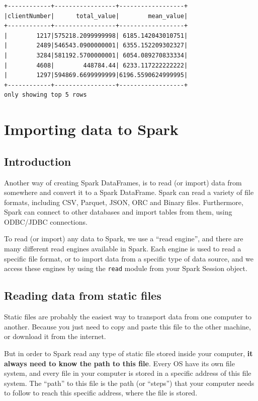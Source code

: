 \documentclass[
  11pt,
  letterpaper,
  DIV=11,
  numbers=noendperiod]{scrreprt}
\begin{document}
\begin{verbatim}
+------------+-----------------+------------------+
|clientNumber|      total_value|        mean_value|
+------------+-----------------+------------------+
|        1217|575218.2099999998| 6185.142043010751|
|        2489|546543.0900000001| 6355.152209302327|
|        3284|581192.5700000001| 6054.089270833334|
|        4608|        448784.44| 6233.117222222222|
|        1297|594869.6699999999|6196.5590624999995|
+------------+-----------------+------------------+
only showing top 5 rows
\end{verbatim}


\hypertarget{sec-import-export}{%
\chapter{Importing data to Spark}\label{sec-import-export}}

\hypertarget{introduction-5}{%
\section{Introduction}\label{introduction-5}}

Another way of creating Spark DataFrames, is to read (or import) data
from somewhere and convert it to a Spark DataFrame. Spark can read a
variety of file formats, including CSV, Parquet, JSON, ORC and Binary
files. Furthermore, Spark can connect to other databases and import
tables from them, using ODBC/JDBC connections.

To read (or import) any data to Spark, we use a ``read engine'', and
there are many different read engines available in Spark. Each engine is
used to read a specific file format, or to import data from a specific
type of data source, and we access these engines by using the
\texttt{read} module from your Spark Session object.

\hypertarget{reading-data-from-static-files}{%
\section{Reading data from static
files}\label{reading-data-from-static-files}}

Static files are probably the easiest way to transport data from one
computer to another. Because you just need to copy and paste this file
to the other machine, or download it from the internet.

But in order to Spark read any type of static file stored inside your
computer, \textbf{it always need to know the path to this file}. Every
OS have its own file system, and every file in your computer is stored
in a specific address of this file system. The ``path'' to this file is
the path (or ``steps'') that your computer needs to follow to reach this
specific address, where the file is stored.
\end{document}
